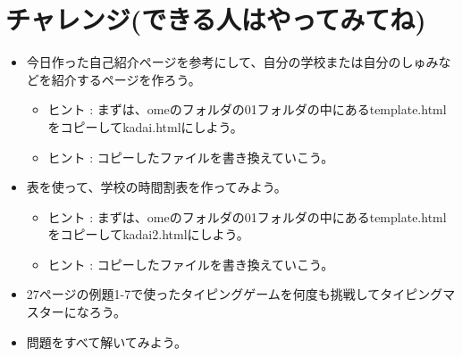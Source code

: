 \documentclass[a4paper,12pt]{jarticle}
\begin{document}
\section{チャレンジ(できる人はやってみてね)}
\begin{itemize}
      \item
            今日作った自己紹介ページを参考にして、自分の学校または自分のしゅみなどを紹介するページを作ろう。

            \begin{itemize}
                  \item ヒント :
                        まずは、omeのフォルダの01フォルダの中にあるtemplate.htmlをコピーしてkadai.htmlにしよう。
                  \item ヒント :
                        コピーしたファイルを書き換えていこう。
            \end{itemize}
      \item
            表を使って、学校の時間割表を作ってみよう。

            \begin{itemize}
                  \item ヒント :
                        まずは、omeのフォルダの01フォルダの中にあるtemplate.htmlをコピーしてkadai2.htmlにしよう。
                  \item ヒント :
                        コピーしたファイルを書き換えていこう。
            \end{itemize}
      \item
            27ページの例題1-7で使ったタイピングゲームを何度も挑戦してタイピングマスターになろう。
      \item 問題をすべて解いてみよう。
\end{itemize}

\bigskip


\bigskip


\bigskip

\clearpage
\end{document}
